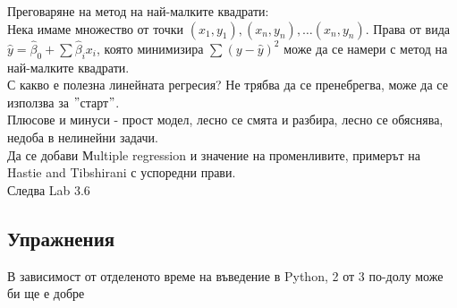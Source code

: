 \documentclass{article}
\begin{document}
	Преговаряне на метод на най-малките квадрати: \\
	Нека имаме множество от точки $(x_1,y_1), (x_n,y_n), \dots (x_n,y_n)$. 
	Права от вида $\hat y = \hat \beta_0 + \sum \hat \beta_i  x_i $, която минимизира $\sum (y-\hat{y})^2$  може да се намери с метод на най-малките квадрати. \\
	С какво е полезна линейната регресия? Не трябва да се пренебрегва, може да се използва за $"$старт$"$.\\
	Плюсове и минуси - прост модел, лесно се смята и разбира, лесно се обяснява, недоба в нелинейни задачи. \\
	
	Да се добави Мultiple regression и значение на променливите, примерът на Hastie and Tibshirani с успоредни прави. \\
	
	Следва Lab 3.6 
	\subsection{Упражнения}
	В зависимост от отделеното време на въведение в Python,
	2 от 3 по-долу може би ще е добре
	
\end{document}
